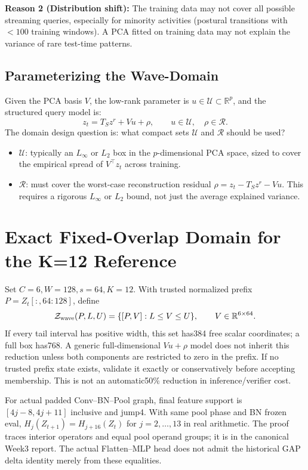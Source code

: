 \documentclass[11pt, a4paper]{article}
\theoremstyle{definition}
\theoremstyle{plain}
\newcommand{\R}{\mathbb{R}}
\begin{document}
\textbf{Reason 2 (Distribution shift):} The training data may not cover all possible
streaming queries, especially for minority activities (postural transitions with
$< 100$ training windows). A PCA fitted on training data may not explain the variance
of rare test-time patterns.

\subsection{Parameterizing the Wave-Domain}

Given the PCA basis $V$, the low-rank parameter is $u \in \mathcal{U} \subset \R^p$,
and the structured query model is:
\[
  z_t = T_S z^r + Vu + \rho, \qquad u \in \mathcal{U}, \quad \rho \in \mathcal{R}.
\]
The domain design question is: what compact sets $\mathcal{U}$ and $\mathcal{R}$ should be used?

\begin{itemize}[leftmargin=1.5em]
  \item $\mathcal{U}$: typically an $L_\infty$ or $L_2$ box in the $p$-dimensional
        PCA space, sized to cover the empirical spread of $V^\top z_t$ across training.
  \item $\mathcal{R}$: must cover the worst-case reconstruction residual
        $\rho = z_t - T_S z^r - V u$. This requires a rigorous $L_\infty$ or $L_2$
        bound, not just the average explained variance.
\end{itemize}

\section{Exact Fixed-Overlap Domain for the K=12 Reference}
Set $C=6,W=128,s=64,K=12$. With trusted normalized prefix
$P=Z_t[:,64:128]$, define
\[
 \mathcal Z_{\rm wave}(P,L,U)=\{[P,V]:L\le V\le U\},\qquad
 V\in\mathbb R^{6\times64}.
\]
If every tail interval has positive width, this set has384 free scalar
coordinates; a full box has768. A generic full-dimensional $Vu+\rho$
model does not inherit this reduction unless both components are restricted
to zero in the prefix. If no trusted prefix state exists, validate it exactly
or conservatively before accepting membership. This is not an automatic50\%
reduction in inference/verifier cost.

For actual padded Conv--BN--Pool graph, final feature support is
$[4j-8,4j+11]$ inclusive and jump4. With same pool phase and BN frozen eval,
$H_j(Z_{t+1})=H_{j+16}(Z_t)$ for $j=2,\ldots,13$ in real arithmetic.
The proof traces interior operators and equal pool operand groups; it is in
the canonical Week3 report. The actual Flatten--MLP head does not admit the
historical GAP delta identity merely from these equalities.
\end{document}
